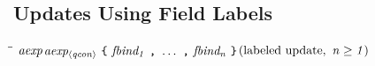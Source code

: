 \subsection{Updates Using Field Labels}
\label{record-update}
\begin{flushleft}\it\begin{tabbing}
\hspace{0.6in}\=\hspace{3.1in}\=\kill
$\it aexp$\>\makebox[3.5em]{$\rightarrow$}$\it aexp_{\langle{}qcon\rangle{}}\ \makebox{\tt {\char'173}}\ fbind_1\ \makebox{\tt ,}\ \ldots \ \makebox{\tt ,}\ fbind_n\ \makebox{\tt {\char'175}}$\>\makebox[3em]{}$\it (\mbox{{\rm labeled\ update}},\ n\geq 1)$
\end{tabbing}\end{flushleft}

